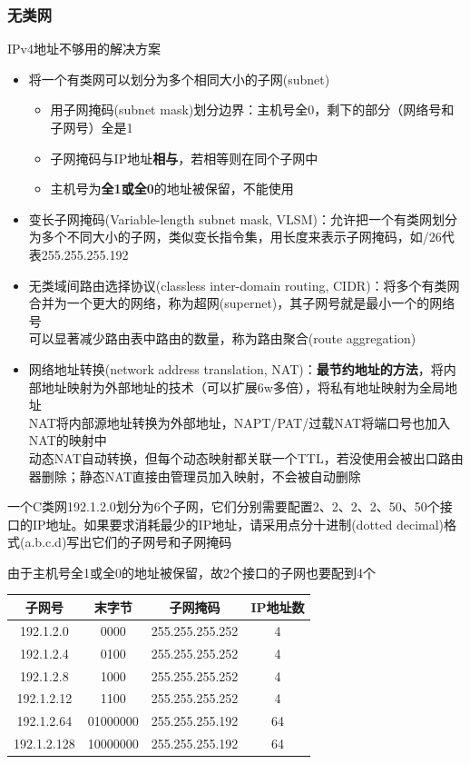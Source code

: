 \subsubsection{无类网}
IPv4地址不够用的解决方案
\begin{itemize}
	\item 将一个有类网可以划分为多个相同大小的子网(subnet)
	\begin{itemize}
		\item 用子网掩码(subnet mask)划分边界：主机号全0，剩下的部分（网络号和子网号）全是1
		\item 子网掩码与IP地址\textbf{相与}，若相等则在同个子网中
		\item 主机号为\textbf{全1或全0}的地址被保留，不能使用
	\end{itemize}
	\item 变长子网掩码(Variable-length subnet mask, VLSM)：允许把一个有类网划分为多个不同大小的子网，类似变长指令集，用长度来表示子网掩码，如/26代表255.255.255.192
	\item 无类域间路由选择协议(classless inter-domain routing, CIDR)：将多个有类网合并为一个更大的网络，称为超网(supernet)，其子网号就是最小一个的网络号\\
可以显著减少路由表中路由的数量，称为路由聚合(route aggregation)
	\item 网络地址转换(network address translation, NAT)：\textbf{最节约地址的方法}，将内部地址映射为外部地址的技术（可以扩展6w多倍），将私有地址映射为全局地址\\
NAT将内部源地址转换为外部地址，NAPT/PAT/过载NAT将端口号也加入NAT的映射中\\
动态NAT自动转换，但每个动态映射都关联一个TTL，若没使用会被出口路由器删除；静态NAT直接由管理员加入映射，不会被自动删除
\end{itemize}
\begin{example}
	一个C类网192.1.2.0划分为6个子网，它们分别需要配置2、2、2、2、50、50个接口的IP地址。如果要求消耗最少的IP地址，请采用点分十进制(dotted decimal)格式(a.b.c.d)写出它们的子网号和子网掩码
\end{example}
\begin{analysis}
	由于主机号全1或全0的地址被保留，故2个接口的子网也要配到4个
	\begin{center}
		\begin{tabular}{cccc}\hline
			子网号 & 末字节 & 子网掩码 & IP地址数\\\hline
			192.1.2.0 & 0000 & 255.255.255.252 & 4\\
			192.1.2.4 & 0100 & 255.255.255.252 & 4\\
			192.1.2.8 & 1000 & 255.255.255.252 & 4\\
			192.1.2.12 & 1100 & 255.255.255.252 & 4\\
			192.1.2.64 & 01000000 & 255.255.255.192 & 64\\
			192.1.2.128 & 10000000 & 255.255.255.192 & 64\\\hline
		\end{tabular}
	\end{center}
\end{analysis}

